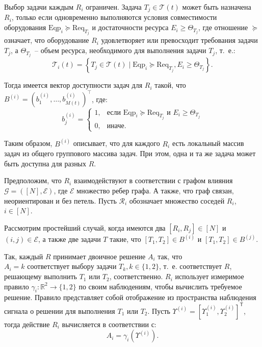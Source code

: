 Выбор задачи каждым $R_i$ ограничен. Задача $T_j \in \mathcal{T}(t)$ может быть назначена $R_i$, только если одновременно выполняются условия совместимости оборудования $\text{Eqp}_i \succeq \text{Req}_{T_j}$ и достаточности ресурса $E_i \geq \Theta_{T_j}$, где отношение $\succeq$ означает, что оборудование $R_i$ удовлетворяет или превосходит требования задачи $T_j$, а $\Theta_{T_j}$~-- объем ресурса, необходимого для выполнения задачи $T_j$, т.\ е.:
\begin{equation}
	\label{eq:choice_task}
	\mathcal{T}_i(t) = \left\{ T_j \in \mathcal{T}(t) \mid \text{Eqp}_i \succeq \text{Req}_{T_j},  E_i \geq \Theta_{T_j} \right\}.
\end{equation}

Тогда имеется вектор доступности задач для $R_i$ такой, что $B^{(i)} = (b_1^{(i)}, \dots, b_{M(t)}^{(i)})^\top$, где:
\begin{equation}
	\label{eq:matrix_task}
	b_j^{(i)} = \begin{cases}
		1, & \text{если } \text{Eqp}_i \succeq \text{Req}_{T_j} \text{ и } E_i \geq \Theta_{T_j} \\
		0, & \text{иначе}.
	\end{cases}
\end{equation}

Таким образом, $B^{(i)}$ описывает, что для каждого $R_i$ есть локальный массив задач из общего группового массива задач. При этом, одна и та же задача может быть доступна для разных $R$.

Предположим, что $R_i$ взаимодействуют в соответствии с графом влияния $\mathcal{G} = ([N], \mathcal{E})$, где $\mathcal{E}$ множество ребер графа. А также, что граф связан, неориентирован и без петель. Пусть $\mathcal{R}_i$ обозначает множество соседей $R_i$, $i \in [N]$.

Рассмотрим простейший случай, когда имеются два $[R_i, R_j] \in [N]$ и $(i, j) \in \mathcal{E}$, а также две задачи $T$ такие, что $[T_1, T_2] \in B^{(i)}$ и $[T_1, T_2] \in B^{(j)}$.

Так, каждый $R$ принимает двоичное решение $A_i$ так, что $A_i = k \text{ соответствует выбору задачи } T_k, k \in \{1,2\}$, т.\ е. соответствует $R$, решающему выполнить $T_1$ или $T_2$, соответственно. $R_i$ использует измеримое правило $\gamma_i: \mathbb{R}^2 \rightarrow \{ 1,2 \}$ по своим наблюдениям, чтобы вычислить требуемое решение. Правило представляет собой отображение из пространства наблюдения сигнала о решении для выполнения $T_1$ или $T_2$. Пусть $\Upsilon^{(i)} = [ \Upsilon_1^{(i)}, \Upsilon_2^{(i)} ]^{\mathsf{T}}$, тогда действие $R_i$ вычисляется в соответствии с:
\begin{equation}
	\label{eq:action_ntts}
	A_i = \gamma_i\left( \Upsilon^{\left(i\right)} \right).
\end{equation}

